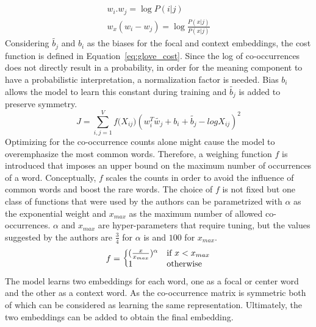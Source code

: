\begin{equation}
\begin{split}
\\ w_{ i }.w_{ j }=\log { P(i|j)\quad  } \\
w_{ x }(w_{ i }-w_{ j })=\log { \frac { P(x|j) }{ P(x|j) } } 
\end{split}
\label{eq:log_prob}
\end{equation}
Considering $ \tilde{b_{ j }}$ and $b_{ i }$  as the biases for the focal and context embeddings, the cost function is defined in Equation~\ref{eq:glove_cost}. Since the log of co-occurrences does not directly result in a probability, in order for the meaning component to have a probabilistic interpretation, a normalization factor is needed. Bias $b_{ i }$ allows the model to learn this constant during training and $ \tilde{b_{ j }}$ is added to preserve symmetry. 
\begin{equation}
J=\sum _{ i,j=1 }^{ V }{ f({ X }_{ ij } } )(w_{ i }^{ T }\tilde{  w_{ j } } +b_{ i }+\tilde{  b_{ j } } -log{ X }_{ ij })^2
\label{eq:glove_cost}
\end{equation}
Optimizing for the co-occurrence counts alone might cause the model to overemphasize the most common words. Therefore, a weighing function $f$ is introduced that imposes an upper bound on the maximum number of occurrences of a word. Conceptually, $f$ scales the counts in order to avoid the influence of common words and boost the rare words. The choice of $f$ is not fixed but one class of functions that were used by the authors can be parametrized with $\alpha$ as the exponential weight and $x_{max}$ as the maximum number of allowed co-occurrences. $\alpha$ and $x_{max}$ are hyper-parameters that require tuning, but the values suggested by the authors are $\frac{3}{4}$ for $\alpha$ is  and $100$ for $x_{max}$. 
\begin{equation}
f=\left\{
  \begin{array}{@{}ll@{}}
    (\frac { x }{ { x }_{ max } } )^{ \alpha  }& \text{if}\ x<x_{max} \\
    1 & \text{otherwise}
  \end{array}\right.
\label{eq:weighingfunction}
\end{equation}
\noindent
The model learns two embeddings for each word, one as a focal or center word and the other as a context word. As the co-occurrence matrix is symmetric both of which can be considered as learning the same representation. Ultimately, the two embeddings can be added to obtain the final embedding.

